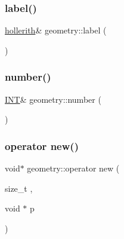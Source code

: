 \mbox{\label{classgeometry_a8be3ddf6aebe1e3c52b67cfe316e638f}} 
\subsubsection{\texorpdfstring{label()}{label()}}
{\footnotesize\ttfamily \mbox{\hyperlink{classhollerith}{hollerith}}\& geometry\+::label (\begin{DoxyParamCaption}{ }\end{DoxyParamCaption})\hspace{0.3cm}{\ttfamily [inline]}}

\mbox{\label{classgeometry_a47f809adc7a1158065da4dfae214f05f}} 
\subsubsection{\texorpdfstring{number()}{number()}}
{\footnotesize\ttfamily \mbox{\hyperlink{galois_8h_a09fddde158a3a20bd2dcadb609de11dc}{I\+NT}}\& geometry\+::number (\begin{DoxyParamCaption}{ }\end{DoxyParamCaption})\hspace{0.3cm}{\ttfamily [inline]}}

\mbox{\label{classgeometry_a9d54b352aeb8544b000c37468a01adc2}} 
\subsubsection{\texorpdfstring{operator new()}{operator new()}}
{\footnotesize\ttfamily void$\ast$ geometry\+::operator new (\begin{DoxyParamCaption}\item[{size\+\_\+t}]{,  }\item[{void $\ast$}]{p }\end{DoxyParamCaption})\hspace{0.3cm}{\ttfamily [inline]}}

\mbox{\label{classgeometry_af5b78aa94f8ef7f432fb1568187ef762}} 
